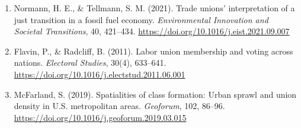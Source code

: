 \documentclass[11pt]{article}\usepackage[]{graphicx}\usepackage[]{xcolor}
\begin{document}
\begin{enumerate}
  \item Normann, H. E., \& Tellmann, S. M. (2021). Trade unions' interpretation of a just transition in a fossil fuel economy. \textit{Environmental Innovation and Societal Transitions}, 40, 421–434. \url{https://doi.org/10.1016/j.eist.2021.09.007}
  
  \item Flavin, P., \& Radcliff, B. (2011). Labor union membership and voting across nations. \textit{Electoral Studies}, 30(4), 633–641. \url{https://doi.org/10.1016/j.electstud.2011.06.001}
  
  \item McFarland, S. (2019). Spatialities of class formation: Urban sprawl and union density in U.S. metropolitan areas. \textit{Geoforum}, 102, 86–96. \url{https://doi.org/10.1016/j.geoforum.2019.03.015}
\end{enumerate}
\end{document}
